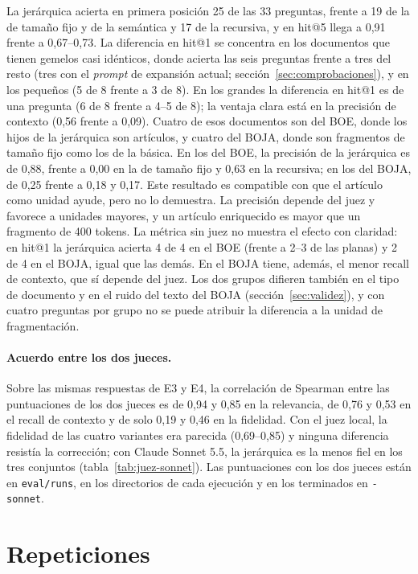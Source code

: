 La jerárquica acierta en primera posición 25 de las 33 preguntas, frente a 19 de la de tamaño fijo y de la semántica y 17 de la recursiva, y en hit@5 llega a 0,91 frente a 0,67--0,73. La diferencia en hit@1 se concentra en los documentos que tienen gemelos casi idénticos, donde acierta las seis preguntas frente a tres del resto (tres con el \emph{prompt} de expansión actual; sección~\ref{sec:comprobaciones}), y en los pequeños (5 de 8 frente a 3 de 8). En los grandes la diferencia en hit@1 es de una pregunta (6 de 8 frente a 4--5 de 8); la ventaja clara está en la precisión de contexto (0,56 frente a 0,09). Cuatro de esos documentos son del BOE, donde los hijos de la jerárquica son artículos, y cuatro del BOJA, donde son fragmentos de tamaño fijo como los de la básica. En los del BOE, la precisión de la jerárquica es de 0,88, frente a 0,00 en la de tamaño fijo y 0,63 en la recursiva; en los del BOJA, de 0,25 frente a 0,18 y 0,17. Este resultado es compatible con que el artículo como unidad ayude, pero no lo demuestra. La precisión depende del juez y favorece a unidades mayores, y un artículo enriquecido es mayor que un fragmento de 400 tokens. La métrica sin juez no muestra el efecto con claridad: en hit@1 la jerárquica acierta 4 de 4 en el BOE (frente a 2--3 de las planas) y 2 de 4 en el BOJA, igual que las demás. En el BOJA tiene, además, el menor recall de contexto, que sí depende del juez. Los dos grupos difieren también en el tipo de documento y en el ruido del texto del BOJA (sección~\ref{sec:validez}), y con cuatro preguntas por grupo no se puede atribuir la diferencia a la unidad de fragmentación.

\paragraph{Acuerdo entre los dos jueces.} Sobre las mismas respuestas de E3 y E4, la correlación de Spearman entre las puntuaciones de los dos jueces es de 0,94 y 0,85 en la relevancia, de 0,76 y 0,53 en el recall de contexto y de solo 0,19 y 0,46 en la fidelidad. Con el juez local, la fidelidad de las cuatro variantes era parecida (0,69--0,85) y ninguna diferencia resistía la corrección; con Claude Sonnet 5.5, la jerárquica es la menos fiel en los tres conjuntos (tabla~\ref{tab:juez-sonnet}). Las puntuaciones con los dos jueces están en \texttt{eval/runs}, en los directorios de cada ejecución y en los terminados en \texttt{-sonnet}.

\section{Repeticiones}
\label{sec:ap-repeticiones}

